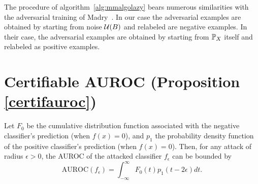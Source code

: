 The procedure of algorithm~\ref{alg:mmalgolazy} bears numerous similarities with the adversarial training of Madry~\cite{madry2017towards}. In our case the adversarial examples are obtained by starting from noise $\mathcal{U}(B)$ and relabeled are negative examples. In their case, the adversarial examples are obtained by starting from $\mathbb{P}_X$ itself and relabeled as positive examples.  

\section{Certifiable AUROC (Proposition \ref{certifauroc})}\label{app:certifauroc}

\begin{proposition}
 Let $F_0$ be the cumulative distribution function associated with the negative classifier's prediction (when $f(x) = 0$), and $p_1$ the probability density function of the positive classifier's prediction (when $f(x) = 0$). Then, for any attack of radius $\epsilon > 0$, the AUROC of the attacked classifier $f_{\epsilon}$ can be bounded by
\begin{equation}
    \text{AUROC}(f_{\epsilon}) = \int_{-\infty}^{\infty} F_0(t)p_1(t-2\epsilon)dt.
\end{equation}
\end{proposition}

